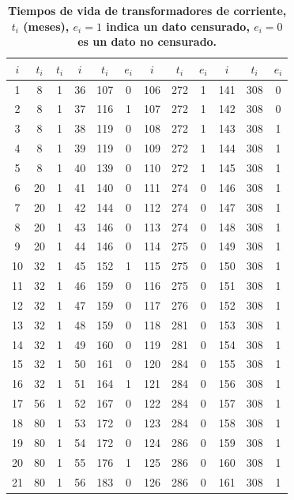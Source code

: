 \begin{table}[h!]\small
\begin{center}
\caption {\bf Tiempos de vida de transformadores de corriente, $t_i$ (meses), $e_i=1$ indica un dato censurado, $e_i=0$ es un dato no censurado.\label{uno}}
\begin{tabular}{ccc|ccc|ccc|ccc}
\toprule[0.6mm]
$i$	&	$t_i$	&	$t_i$	&	$i$	&	$t_i$	&$e_i$	&	$i$	&	$t_i$	&	$e_i$	&	$i$	&	$t_i$	&	$e_i$	\\
\toprule[0.6mm]
1	&	8	&	1	&	36	&	107	&	0	&	106	&	272	&	1	&	141	&	308	&	0	\\
2	&	8	&	1	&	37	&	116	&	1	&	107	&	272	&	1	&	142	&	308	&	0	\\
3	&	8	&	1	&	38	&	119	&	0	&	108	&	272	&	1	&	143	&	308	&	1	\\
4	&	8	&	1	&	39	&	119	&	0	&	109	&	272	&	1	&	144	&	308	&	1	\\
5	&	8	&	1	&	40	&	139	&	0	&	110	&	272	&	1	&	145	&	308	&	1	\\
6	&	20	&	1	&	41	&	140	&	0	&	111	&	274	&	0	&	146	&	308	&	1	\\
7	&	20	&	1	&	42	&	144	&	0	&	112	&	274	&	0	&	147	&	308	&	1	\\
8	&	20	&	1	&	43	&	146	&	0	&	113	&	274	&	0	&	148	&	308	&	1	\\
9	&	20	&	1	&	44	&	146	&	0	&	114	&	275	&	0	&	149	&	308	&	1	\\
10	&	32	&	1	&	45	&	152	&	1	&	115	&	275	&	0	&	150	&	308	&	1	\\
11	&	32	&	1	&	46	&	159	&	0	&	116	&	275	&	0	&	151	&	308	&	1	\\
12	&	32	&	1	&	47	&	159	&	0	&	117	&	276	&	0	&	152	&	308	&	1	\\
13	&	32	&	1	&	48	&	159	&	0	&	118	&	281	&	0	&	153	&	308	&	1	\\
14	&	32	&	1	&	49	&	160	&	0	&	119	&	281	&	0	&	154	&	308	&	1	\\
15	&	32	&	1	&	50	&	161	&	0	&	120	&	284	&	0	&	155	&	308	&	1	\\
16	&	32	&	1	&	51	&	164	&	1	&	121	&	284	&	0	&	156	&	308	&	1	\\
17	&	56	&	1	&	52	&	167	&	0	&	122	&	284	&	0	&	157	&	308	&	1	\\
18	&	80	&	1	&	53	&	172	&	0	&	123	&	284	&	0	&	158	&	308	&	1	\\
19	&	80	&	1	&	54	&	172	&	0	&	124	&	286	&	0	&	159	&	308	&	1	\\
20	&	80	&	1	&	55	&	176	&	1	&	125	&	286	&	0	&	160	&	308	&	1	\\
21	&	80	&	1	&	56	&	183	&	0	&	126	&	286	&	0	&	161	&	308	&	1	\\

\end{tabular}
\end{center}
\end{table}
